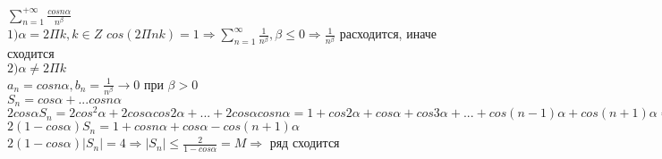 \begin{Example}
	$\sum^{+\infty}_{n=1} \frac{cos n\alpha}{n^{\beta}}$\\
	$1) \alpha = 2\Pi k, k \in Z$ $cos(2 \Pi nk) = 1 \Rightarrow \sum^{\infty}_{n=1} \frac{1}{n^{\beta}}, \beta \leq 0 \Rightarrow \frac{1}{n^{\beta}}$ расходится, иначе сходится\\
	$2) \alpha \neq 2 \Pi k$\\
	$a_n = cos n\alpha, b_n = \frac{1}{n^{\beta}} \rightarrow 0$ при $\beta > 0$\\
	$S_n = cos \alpha + ... cos n\alpha$\\
	$2cos\alpha S_n = 2cos^2\alpha + 2cos\alpha cos2\alpha + ... + 2cos\alpha cosn\alpha = 1 + cos2\alpha + cos\alpha + cos3\alpha + ... + cos(n-1)\alpha + cos(n+1)\alpha = 1 + S_n - cosn\alpha + S_n - cos \alpha + cos(n+1)\alpha$\\
	$2(1-cos\alpha)S_n = 1 + cos n\alpha + cos\alpha - cos(n+1)\alpha$\\
	$2(1-cos\alpha)|S_n| = 4 \Rightarrow |S_n| \leq \frac{2}{1-cos\alpha} = M \Rightarrow$ ряд сходится\\
\end{Example}

